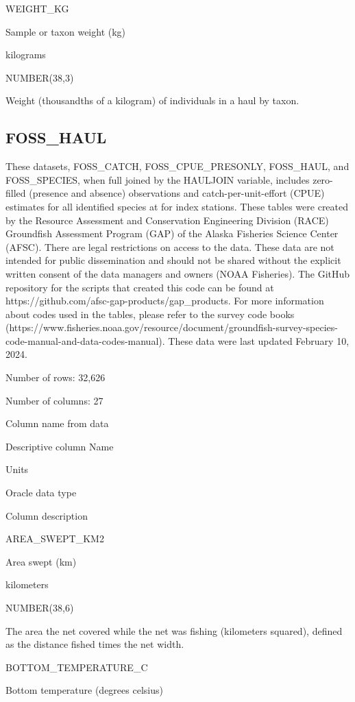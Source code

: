 \documentclass[
  letterpaper,
  oneside,
  open=any]{scrbook}
\begin{document}
WEIGHT\_KG

Sample or taxon weight (kg)

kilograms

NUMBER(38,3)

Weight (thousandths of a kilogram) of individuals in a haul by taxon.

\hypertarget{foss_haul}{%
\subsection{FOSS\_HAUL}\label{foss_haul}}

These datasets, FOSS\_CATCH, FOSS\_CPUE\_PRESONLY, FOSS\_HAUL, and
FOSS\_SPECIES, when full joined by the HAULJOIN variable, includes
zero-filled (presence and absence) observations and
catch-per-unit-effort (CPUE) estimates for all identified species at for
index stations. These tables were created by the Resource Assessment and
Conservation Engineering Division (RACE) Groundfish Assessment Program
(GAP) of the Alaska Fisheries Science Center (AFSC). There are legal
restrictions on access to the data. These data are not intended for
public dissemination and should not be shared without the explicit
written consent of the data managers and owners (NOAA Fisheries). The
GitHub repository for the scripts that created this code can be found at
https://github.com/afsc-gap-products/gap\_products. For more information
about codes used in the tables, please refer to the survey code books
(https://www.fisheries.noaa.gov/resource/document/groundfish-survey-species-code-manual-and-data-codes-manual).
These data were last updated February 10, 2024.

Number of rows: 32,626

Number of columns: 27

Column name from data

Descriptive column Name

Units

Oracle data type

Column description

AREA\_SWEPT\_KM2

Area swept (km)

kilometers

NUMBER(38,6)

The area the net covered while the net was fishing (kilometers squared),
defined as the distance fished times the net width.

BOTTOM\_TEMPERATURE\_C

Bottom temperature (degrees celsius)
\end{document}

